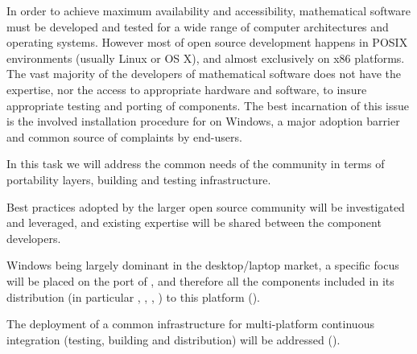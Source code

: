 \begin{workpackage}[id=component-architecture,wphases=0-48!.5,
  title=Component Architecture,lead=UV,
  PSRM=50,UVRM=8,SARM=16, USORM=6, UORM=4, LLRM=14, UJFRM=6, UGRM=14]
  \begin{tasklist}
  \begin{task}[id=portability,title=Portability,lead=UV,PM=28,partners={PS,UG},wphases=0-36]
    In order to achieve maximum availability and accessibility,
    mathematical software must be developed and tested for a wide range
    of computer architectures and operating systems.  However most of
    open source development happens in POSIX environments (usually
    Linux or OS X), and almost exclusively on x86 platforms.  The vast
    majority of the developers of mathematical software does not have
    the expertise, nor the access to appropriate hardware and software, to insure
    appropriate testing and porting of components.  The best
    incarnation of this issue is the involved installation procedure
    for \Sage on Windows, a major adoption barrier and common source of
    complaints by end-users.

    In this task we will address the common needs of the community in
    terms of portability layers, building and testing infrastructure.

    \begin{compactitem}
    \item Best practices adopted by the larger open source community
      will be investigated and leveraged, and existing expertise will
      be shared between the component developers.
    \item Windows being largely dominant in the desktop/laptop market,
      a specific focus will be placed on the port of \Sage, and
      therefore all the components included in its distribution (in
      particular \PariGP, \GAP, \Singular, \Linbox) to this platform
      ().
    \item The deployment of a common infrastructure for multi-platform
      continuous integration (testing, building and distribution) will
      be addressed
      ().
    \end{compactitem}


\end{task}
\end{tasklist}
\end{workpackage}
